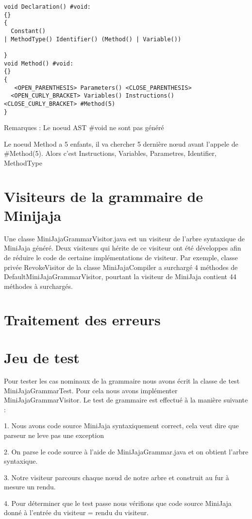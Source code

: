 \documentclass[a4paper,12pt]{article}
\begin{document}
\lstset{language=Java}
\begin{lstlisting}
void Declaration() #void: 
{}
{
  Constant()
| MethodType() Identifier() (Method() | Variable())

}
void Method() #void: 
{}
{
   <OPEN_PARENTHESIS> Parameters() <CLOSE_PARENTHESIS>
  <OPEN_CURLY_BRACKET> Variables() Instructions()  <CLOSE_CURLY_BRACKET> #Method(5)
}  
\end{lstlisting}

Remarques :
Le noeud AST \#void ne sont pas généré

Le noeud Method a 5 enfants, il va chercher 5 dernière nœud avant l’appele de \#Method(5). Alors c'est Instructions, Variables, Parametres, Identifier, MethodType

\section{Visiteurs de la grammaire de Minijaja }
Une classe MiniJajaGrammarVisitor.java est un visiteur de l’arbre syntaxique de MiniJaja généré. Deux visiteurs qui hérite de ce visiteur ont été développes afin de réduire le code de certaine implémentations de visiteur. Par exemple, classe privée RevokeVisitor de la classe MiniJajaCompiler a surchargé 4 méthodes de DefaultMiniJajaGrammarVisitor, pourtant la visiteur de MiniJaja contient 44 méthodes à surchargés.     

\section{Traitement des erreurs  }
\section{Jeu de test}
Pour tester les cas nominaux de la grammaire nous avons écrit la classe de test MiniJajaGrammarTest. Pour cela nous avons implémenter MiniJajaGrammarVisitor. Le test de grammaire est effectué à la manière suivante : 

1. Nous avons code source MiniJaja syntaxiquement correct, cela veut dire que parseur ne leve pas une exception

2. On parse le code source à l'aide de MiniJajaGrammar.java et on obtient l'arbre syntaxique. 

3. Notre visiteur parcours chaque nœud de notre arbre et construit au fur à mesure un rendu. 

4. Pour déterminer que le test passe nous vérifions que code source MiniJaja donné à l'entrée du visiteur = rendu du visiteur.   
\end{document}
